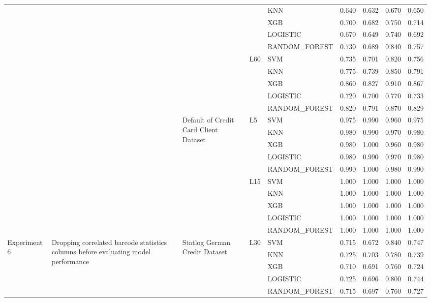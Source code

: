 \begin{table}
\begin{tabular}{lllllrrrr}
 &  &  &  & KNN & 0.640 & 0.632 & 0.670 & 0.650 \\
 &  &  &  & XGB & 0.700 & 0.682 & 0.750 & 0.714 \\
 &  &  &  & LOGISTIC & 0.670 & 0.649 & 0.740 & 0.692 \\
 &  &  &  & RANDOM\_FOREST & 0.730 & 0.689 & 0.840 & 0.757 \\
\cline{4-9}
 &  &  & \multirow[t]{5}{*}{L60} & SVM & 0.735 & 0.701 & 0.820 & 0.756 \\
 &  &  &  & KNN & 0.775 & 0.739 & 0.850 & 0.791 \\
 &  &  &  & XGB & 0.860 & 0.827 & 0.910 & 0.867 \\
 &  &  &  & LOGISTIC & 0.720 & 0.700 & 0.770 & 0.733 \\
 &  &  &  & RANDOM\_FOREST & 0.820 & 0.791 & 0.870 & 0.829 \\
\cline{3-9} \cline{4-9}
 &  & \multirow[t]{10}{*}{Default of Credit Card Client Dataset} & \multirow[t]{5}{*}{L5} & SVM & 0.975 & 0.990 & 0.960 & 0.975 \\
 &  &  &  & KNN & 0.980 & 0.990 & 0.970 & 0.980 \\
 &  &  &  & XGB & 0.980 & 1.000 & 0.960 & 0.980 \\
 &  &  &  & LOGISTIC & 0.980 & 0.990 & 0.970 & 0.980 \\
 &  &  &  & RANDOM\_FOREST & 0.990 & 1.000 & 0.980 & 0.990 \\
\cline{4-9}
 &  &  & \multirow[t]{5}{*}{L15} & SVM & 1.000 & 1.000 & 1.000 & 1.000 \\
 &  &  &  & KNN & 1.000 & 1.000 & 1.000 & 1.000 \\
 &  &  &  & XGB & 1.000 & 1.000 & 1.000 & 1.000 \\
 &  &  &  & LOGISTIC & 1.000 & 1.000 & 1.000 & 1.000 \\
 &  &  &  & RANDOM\_FOREST & 1.000 & 1.000 & 1.000 & 1.000 \\
\cline{1-9} \cline{2-9} \cline{3-9} \cline{4-9}
\multirow[t]{20}{*}{Experiment 6} & \multirow[t]{20}{*}{Dropping correlated barcode statistics columns before evaluating model performance} & \multirow[t]{10}{*}{Statlog German Credit Dataset} & \multirow[t]{5}{*}{L30} & SVM & 0.715 & 0.672 & 0.840 & 0.747 \\
 &  &  &  & KNN & 0.725 & 0.703 & 0.780 & 0.739 \\
 &  &  &  & XGB & 0.710 & 0.691 & 0.760 & 0.724 \\
 &  &  &  & LOGISTIC & 0.725 & 0.696 & 0.800 & 0.744 \\
 &  &  &  & RANDOM\_FOREST & 0.715 & 0.697 & 0.760 & 0.727 \\

\end{tabular}
\end{table}
